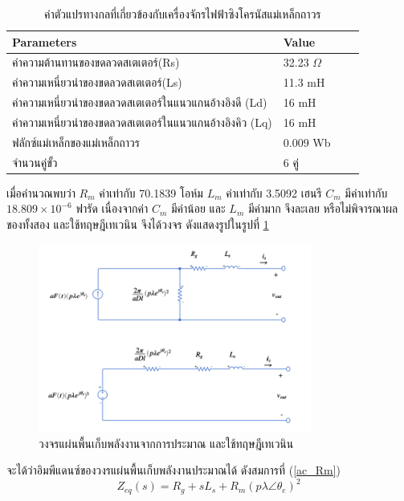 \documentclass[11pt,a4paper]{article}
\begin{document}
\begin{table}[H]
    \centering
    \begin{tabular}{ | l | l | l | p{5cm} |}
        \hline
        \textbf{Parameters}                              & \textbf{Value} \\ \hline
        ค่าความต้านทานของขดลวดสเตเตอร์(Rs)                  & 32.23 $\Omega$ \\ \hline
        ค่าความเหนี่ยวนำของขดลวดสเตเตอร์(Ls)                 & 11.3 mH        \\ \hline
        ค่าความเหนี่ยวนำของขดลวดสเตเตอร์ในแนวแกนอ้างอิงดี (Ld)  & 16 mH          \\ \hline
        ค่าความเหนี่ยวนำของขดลวดสเตเตอร์ในแนวแกนอ้างอิงคิว (Lq) & 16 mH          \\ \hline
        ฟลักซ์แม่เหล็กของแม่เหล็กถาวร                          & 0.009 Wb       \\ \hline
        จำนวนคู่ขั้ว                                         & 6 คู่            \\ \hline
    \end{tabular}
    \caption{ค่าตัวแปรทางกลที่เกี่ยวข้องกับเครื่องจักรไฟฟ้าซิงโครนัสแม่เหล็กถาวร\cite{GpH:01}}
    \label{pmsm_param}
\end{table}
เมื่อคำนวณพบว่า $R_{m}$ ค่าเท่ากับ 70.1839 โอห์ม $L_{m}$  ค่าเท่ากับ 3.5092 เฮนรี $C_{m}$  มีค่าเท่ากับ $18.809 \times 10^{-6}$ ฟารัด เนื่องจากค่า $C_{m}$ มีค่าน้อย และ $L_{m}$ มีค่ามาก จึงละเลย หรือไม่พิจารณาผลของทั้งสอง และใช้ทฤษฎีเทเวนิน จึงได้วงจร ดังแสดงรูปในรูปที่ \ref{approx_Rm}
\begin{figure}[H]
    \begin{center}
        \includegraphics[width=0.8\textwidth]{approx_Rm.png}
    \end{center}
    \caption{วงจรแผ่นพื้นเก็บพลังงานจากการประมาณ และใช้ทฤษฎีเทเวนิน}
    \label{approx_Rm}
\end{figure}
จะได้ว่าอิมพีแดนซ์ของวงรแผ่นพื้นเก็บพลังงานประมาณได้ ดังสมการที่ (\ref{ac_Rm}) 
\begin{equation} \label{ac_Rm}
    Z_{eq}(s)=  R_{g} + sL_{s} + R_{m}(p\lambda \angle \theta_{e})^2  
\end{equation}
\end{document}
